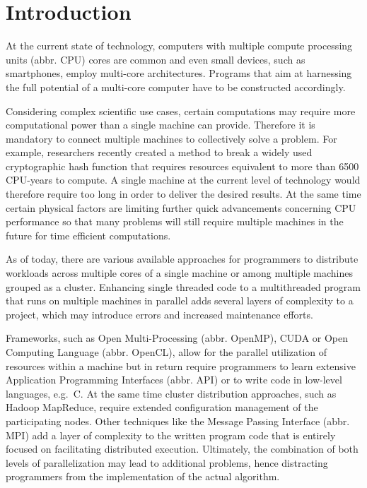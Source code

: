 \chapter{Introduction}
\label{intro}
At the current state of technology, computers with multiple compute processing units (abbr. CPU) cores are common and even small devices, such as smartphones, employ multi-core architectures\cite{arm_big_little}. Programs that aim at harnessing the full potential of a multi-core computer have to be constructed accordingly.

Considering complex scientific use cases, certain computations may require more computational power than a single machine can provide. Therefore it is mandatory to connect multiple machines to collectively solve a problem. For example, researchers recently created a method to break a widely used cryptographic hash function that requires resources equivalent to more than 6500 CPU-years to compute\cite{shattered}. A single machine at the current level of technology would therefore require too long in order to deliver the desired results. At the same time certain physical factors are limiting further quick advancements concerning CPU performance\cite{end_of_moores_law}\cite{end_of_silicon} so that many problems will still require multiple machines in the future for time efficient computations.

As of today, there are various available approaches for programmers to distribute workloads across multiple cores of a single machine or among multiple machines grouped as a cluster. Enhancing single threaded code to a multithreaded program that runs on multiple machines in parallel adds several layers of complexity to a project, which may introduce errors and increased maintenance efforts.

Frameworks, such as Open Multi-Processing (abbr. OpenMP), CUDA or Open Computing Language (abbr. OpenCL), allow for the parallel utilization of resources within a machine but in return require programmers to learn extensive Application Programming Interfaces (abbr. API) or to write code in low-level languages, e.g.~C.
At the same time cluster distribution approaches, such as Hadoop MapReduce, require extended configuration management of the participating nodes. Other techniques like the Message Passing Interface (abbr. MPI) add a layer of complexity to the written program code that is entirely focused on facilitating distributed execution.
Ultimately, the combination of both levels of parallelization may lead to additional problems, hence distracting programmers from the implementation of the actual algorithm.

